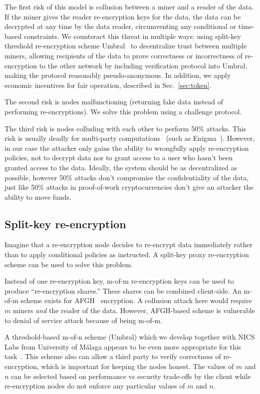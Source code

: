 \documentclass[longbibliography,nofootinbib]{revtex4-1}
\begin{document}
The first risk of this model is collusion between a miner and a reader of the data.
If the miner gives the reader re-encryption keys for the data,
the data can be decrypted at any time by the data reader, circumventing any conditional or time-based constraints.
We counteract this threat in multiple ways:
using split-key threshold re-encryption scheme Umbral~\cite{umbral-spec} to decentralize trust between multiple miners,
allowing recipients of the data to prove correctness or incorrectness of re-encryption to the other network by including verification protocol into Umbral,
making the protocol reasonably pseudo-anonymous.
In addition, we apply economic incentives for fair operation, described in Sec.~\ref{sec:token}.

The second risk is nodes malfunctioning (returning fake data instead of performing re-encryptions).
We solve this problem using a challenge protocol.

The third risk is nodes colluding with each other to perform 50\% attacks.
This risk is usually deadly for multi-party computations~\cite{vitalik-secret-dao} (such as Enigma~\cite{enigma}). However, in our case the attacker only gains the ability to wrongfully apply re-encryption policies, not to decrypt data nor to grant access to a user who hasn't been granted access to the data.
Ideally, the system should be as decentralized as possible, however 50\% attacks don't compromise the confidentiality of the data, just like 50\% attacks in
proof-of-work cryptocurrencies don't give an attacker the ability to move funds.

\subsection{Split-key re-encryption}
\label{sec:split-key}

Imagine that a re-encryption node decides to re-encrypt data immediately rather than to apply conditional policies as instructed.
A split-key proxy re-encryption scheme can be used to solve this problem.

Instead of one re-encryption key, m-of-m re-encryption keys can be used to produce ``re-encryption shares.''
These shares can be combined client-side.
An m-of-m scheme exists for AFGH~\cite{AFGH} encryption.
A collusion attack here would require $m$ miners \emph{and} the reader of the data.
However, AFGH-based scheme is vulnerable to denial of service attack because of being m-of-m.

A threshold-based m-of-n scheme (Umbral) which we develop together with NICS Labs from University of M{\'a}laga appears to be even more appropriate for this
task~\cite{umbral-spec}.
This scheme also can allow a third party to verify correctness of re-encryption, which is important for keeping the nodes honest.
The values of $m$ and $n$ can be selected based on performance vs security trade-offs by the client while re-encryption nodes do not enforce any particular
values of $m$ and $n$.
\end{document}
